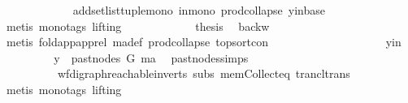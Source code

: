 \begin{isabellebody}
\ \ \ \ \ \ \ \ \ \ \isamarkupfalse%
\ \ add{\isacharunderscore}{\kern0pt}set{\isacharunderscore}{\kern0pt}list{\isacharunderscore}{\kern0pt}tuple{\isacharunderscore}{\kern0pt}mono\ in{\isacharunderscore}{\kern0pt}mono\ prod{\isachardot}{\kern0pt}collapse\ y{\isacharunderscore}{\kern0pt}in{\isacharunderscore}{\kern0pt}base\isanewline
\ \ \ \ \ \ \ \ \ \ \isamarkupfalse%
\ {\isacharparenleft}{\kern0pt}metis\ {\isacharparenleft}{\kern0pt}mono{\isacharunderscore}{\kern0pt}tags{\isacharcomma}{\kern0pt}\ lifting{\isacharparenright}{\kern0pt}{\isacharparenright}{\kern0pt}\ \isanewline
\ \ \ \ \ \ \ \ \isamarkupfalse%
\ \isamarkupfalse%
\ {\isacharquery}{\kern0pt}thesis\ \isamarkupfalse%
\ backw\isanewline
\ \ \ \ \ \ \ \ \ \ \isamarkupfalse%
\ {\isacharparenleft}{\kern0pt}metis\ fold{\isacharunderscore}{\kern0pt}app{\isacharunderscore}{\kern0pt}app{\isacharunderscore}{\kern0pt}rel\ ma{\isacharunderscore}{\kern0pt}def\ prod{\isachardot}{\kern0pt}collapse\ top{\isacharunderscore}{\kern0pt}sort{\isacharunderscore}{\kern0pt}con{\isacharparenright}{\kern0pt}\ \isanewline
\ \ \ \ \ \ \isamarkupfalse%
\isanewline
\ \ \ \ \isamarkupfalse%
\isanewline
\ \ \ \ \ \ \isamarkupfalse%
\ y{\isacharunderscore}{\kern0pt}in\isanewline
\ \ \ \ \ \ \isamarkupfalse%
\ \isamarkupfalse%
\ {\isachardoublequoteopen}y\ {\isasymin}\ past{\isacharunderscore}{\kern0pt}nodes\ G\ ma{\isachardoublequoteclose}\ \isamarkupfalse%
\ past{\isacharunderscore}{\kern0pt}nodes{\isachardot}{\kern0pt}simps\ \isamarkupfalse%
\ {}{\isacharparenleft}{\kern0pt}{}{\isacharcomma}{\kern0pt}{}{\isacharparenright}{\kern0pt}\isanewline
\ \ \ \ \ \ \ \ \ \ wf{\isacharunderscore}{\kern0pt}digraph{\isachardot}{\kern0pt}reachable{}{\isacharunderscore}{\kern0pt}in{\isacharunderscore}{\kern0pt}verts{\isacharparenleft}{\kern0pt}{}{\isacharparenright}{\kern0pt}\ subs{\isacharparenleft}{\kern0pt}{}{\isacharparenright}{\kern0pt}\ mem{\isacharunderscore}{\kern0pt}Collect{\isacharunderscore}{\kern0pt}eq\ trancl{\isacharunderscore}{\kern0pt}trans\isanewline
\ \ \ \ \ \ \ \ \isamarkupfalse%
\ {\isacharparenleft}{\kern0pt}metis\ {\isacharparenleft}{\kern0pt}mono{\isacharunderscore}{\kern0pt}tags{\isacharcomma}{\kern0pt}\ lifting{\isacharparenright}{\kern0pt}{\isacharparenright}{\kern0pt}\ \isanewline
\ \ \ \ \ \ \isamarkupfalse%

\end{isabellebody}
